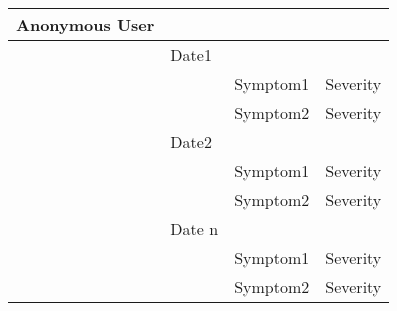  \begin{table}[]
  \begin{tabular}{llll}
  \hline
  Anonymous User &        &          &          \\ \hline
                 & Date1  &          &          \\
                 &        & Symptom1 & Severity \\
                 &        & Symptom2 & Severity \\
                 & Date2  &          &          \\
                 &        & Symptom1 & Severity \\
                 &        & Symptom2 & Severity \\
                 & Date n &          &          \\
                 &        & Symptom1 & Severity \\
                 &        & Symptom2 & Severity \\ \hline
  \end{tabular}
  \end{table}